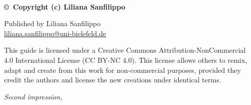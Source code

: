 \pagecolor{pgcolor}
~\vfill
\thispagestyle{empty}
\setlength{\parindent}{0pt}
\setlength{\parskip}{\baselineskip}


\textbf{\copyright\ Copyright (c) Liliana Sanfilippo \the\year\ }


\small{Published by Liliana Sanfilippo}\\
\small{\href{mailto:liliana.sanfilippo@uni-bielefeld.de}{liliana.sanfilippo@uni-bielefeld.de}}




\begin{flushright}
	This guide is licensed under a Creative Commons Attribution-NonCommercial 4.0 International License (CC BY-NC 4.0). This license allows others to remix, adapt and create from this work for non-commercial purposes, provided they credit the authors and license the new creations under identical terms.
\end{flushright}

\par\textit{Second impression, \monthyear}

\setlength{\parindent}{\indentacaopar}

\restoregeometry
\nopagecolor